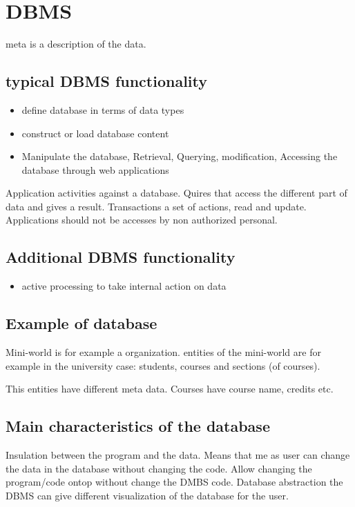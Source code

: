 
\section{DBMS}

meta is a description of the data. 

\subsection*{typical DBMS functionality}
\begin{itemize}
	\item define database in terms of data types
	\item construct or load database content
	\item Manipulate the database, Retrieval, Querying, modification, Accessing the database through web applications
\end{itemize}


Application activities against a database. Quires that access the different part of data and gives a result. Transactions a set of actions, read and update. Applications should not be accesses by non authorized personal. 

\subsection*{Additional DBMS functionality}
\begin{itemize}
	\item active processing to take internal action on data
\end{itemize}


\subsection*{Example of database}
Mini-world is for example a organization. entities of the mini-world are for example in the university case: students, courses and sections (of courses).  

This entities have different meta data. Courses have course name, credits etc. 

\subsection*{Main characteristics of the database}
Insulation between the program and the data. Means that me as user can change the data in the database without changing the code. Allow changing the program/code ontop without change the DMBS code. 
Database abstraction the DBMS can give different visualization of the database for the user.

